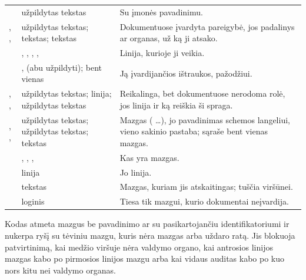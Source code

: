 \par\nopagebreak
\begin{xltabular}{\textwidth}{@{}L{40mm}L{34mm}Y@{}}
\toprule
{} &  &  \\
\midrule
\endhead
\bottomrule
\endlastfoot
{} & užpildytas tekstas & Su įmonės pavadinimu. \\
, ,  & užpildytas tekstas; tekstas; tekstas & Dokumentuose įvardyta pareigybė, jos padalinys ar organas, už ką ji atsako. \\
 & , , , ,  & Linija, kurioje ji veikia. \\
 & ,  (abu užpildyti); bent vienas & Ją įvardijančios ištraukos, pažodžiui. \\
, ,  & užpildytas tekstas; linija; užpildytas tekstas & Reikalinga, bet dokumentuose nerodoma rolė, jos linija ir ką reiškia ši spraga. \\
, ,  & užpildytas tekstas; užpildytas tekstas; tekstas & Mazgas ( …), jo pavadinimas schemos langeliui, vieno sakinio pastaba; sąraše bent vienas mazgas. \\
 & , , ,  & Kas yra mazgas. \\
 & linija & Jo linija. \\
 & tekstas & Mazgas, kuriam jis atskaitingas; tuščia viršūnei. \\
 & loginis & Tiesa tik mazgui, kurio dokumentai neįvardija. \\
\end{xltabular}

Kodas atmeta mazgus be pavadinimo ar su pasikartojančiu identifikatoriumi ir nukerpa ryšį su
tėviniu mazgu, kuris nėra mazgas arba uždaro ratą. Jis blokuoja patvirtinimą, kai medžio
viršuje nėra valdymo organo, kai antrosios linijos mazgas kabo po pirmosios linijos mazgu arba
kai vidaus auditas kabo po kuo nors kitu nei valdymo organas.

